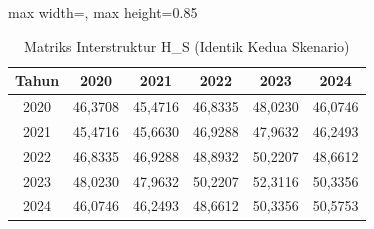 \begin{table}[H]
\centering
\caption{Matriks Interstruktur H\_S (Identik Kedua Skenario)} \label{tab:apph_s}
\begin{adjustbox}{max width=\textwidth, max height=0.85\textheight}
\begin{tabular}{|c|c|c|c|c|c|}
\hline
\textbf{Tahun} & \textbf{2020} & \textbf{2021} & \textbf{2022} & \textbf{2023} & \textbf{2024} \\
\hline
2020 & 46,3708 & 45,4716 & 46,8335 & 48,0230 & 46,0746 \\
2021 & 45,4716 & 45,6630 & 46,9288 & 47,9632 & 46,2493 \\
2022 & 46,8335 & 46,9288 & 48,8932 & 50,2207 & 48,6612 \\
2023 & 48,0230 & 47,9632 & 50,2207 & 52,3116 & 50,3356 \\
2024 & 46,0746 & 46,2493 & 48,6612 & 50,3356 & 50,5753 \\
\hline
\end{tabular}
\end{adjustbox}
\end{table}